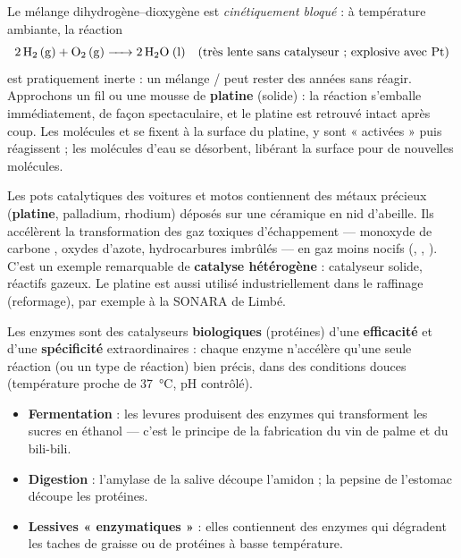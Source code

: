 \documentclass[11pt]{article}
\newcommand{\cle}[1]{{\popxbold\color{popdark}#1}}
\newcounter{popsec}
\newcounter{popsub}
\newcommand{\courssub}[1]{%
  \stepcounter{popsub}%
  \par\vspace{9pt}\noindent{\popxbold\fontsize{11.5}{13}\selectfont\color{popink}{\color{poporange}\thepopsec.\thepopsub}\hspace{6pt}#1}\par\nopagebreak\vspace{4pt}
}
\begin{document}
\begin{experience}
Le mélange dihydrogène--dioxygène est \emph{cinétiquement bloqué} : à température ambiante, la réaction
\[ \ce{2 H2 (g) + O2 (g) -> 2 H2O (l)} \quad \text{(très lente sans catalyseur ; explosive avec Pt)} \]
est pratiquement inerte : un mélange / peut rester des années sans réagir. Approchons un fil ou une mousse de \textbf{platine} (solide) : la réaction s'emballe immédiatement, de façon spectaculaire, et le platine est retrouvé intact après coup. Les molécules  et  se fixent à la surface du platine, y sont « activées » puis réagissent ; les molécules d'eau se désorbent, libérant la surface pour de nouvelles molécules.
\end{experience}

\begin{savaistu}
Les pots catalytiques des voitures et motos contiennent des métaux précieux (\textbf{platine}, palladium, rhodium) déposés sur une céramique en nid d'abeille. Ils accélèrent la transformation des gaz toxiques d'échappement — monoxyde de carbone , oxydes d'azote, hydrocarbures imbrûlés — en gaz moins nocifs (, , ). C'est un exemple remarquable de \textbf{catalyse hétérogène} : catalyseur solide, réactifs gazeux. Le platine est aussi utilisé industriellement dans le raffinage (reformage), par exemple à la SONARA de Limbé.
\end{savaistu}

\courssub{La catalyse enzymatique}

\begin{definition}
Les \cle{enzymes} sont des catalyseurs \textbf{biologiques} (protéines) d'une \textbf{efficacité} et d'une \textbf{spécificité} extraordinaires : chaque enzyme n'accélère qu'une seule réaction (ou un type de réaction) bien précis, dans des conditions douces (température proche de \SI{37}{\celsius}, pH contrôlé).
\end{definition}

\begin{exemplebox}
\begin{itemize}
\item \textbf{Fermentation} : les levures produisent des enzymes qui transforment les sucres en éthanol — c'est le principe de la fabrication du vin de palme et du bili-bili.
\item \textbf{Digestion} : l'amylase de la salive découpe l'amidon ; la pepsine de l'estomac découpe les protéines.
\item \textbf{Lessives « enzymatiques »} : elles contiennent des enzymes qui dégradent les taches de graisse ou de protéines à basse température.
\end{itemize}
\end{exemplebox}
\end{document}
